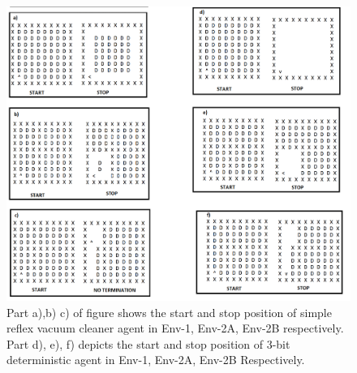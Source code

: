 \documentclass{article}
\begin{document}
\begin{figure}[h!]
\centering
\includegraphics[width=1\linewidth]{all_in_one.png}
\caption{Part a),b) c) of figure shows the start and stop position of simple reflex vacuum cleaner agent in Env-1, Env-2A, Env-2B respectively. Part d), e), f) depicts the start and stop position of 3-bit deterministic agent in Env-1, Env-2A, Env-2B Respectively.}
\label{fig:method}
\end{figure}
\end{document}
